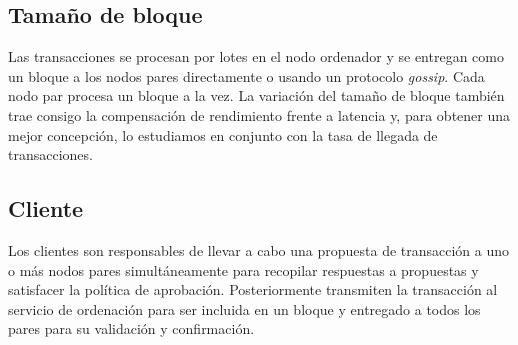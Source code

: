 \subsection{Tama\~no de bloque}
Las transacciones se procesan por lotes en el nodo ordenador y se entregan como un bloque a los nodos pares directamente o usando un protocolo \emph{gossip}. Cada nodo par procesa un bloque a la vez. La variaci\'on del tama\~no de bloque tambi\'en trae consigo la compensaci\'on de rendimiento frente a latencia y, para obtener una mejor concepci\'on, lo estudiamos en conjunto con la tasa de llegada de transacciones.

\subsection{Cliente}
Los clientes son responsables de llevar a cabo una propuesta de transacci\'on a uno o m\'as nodos pares simult\'aneamente para recopilar respuestas a propuestas y satisfacer la pol\'itica de aprobaci\'on. Posteriormente transmiten la transacci\'on al servicio de ordenaci\'on para ser incluida en un bloque y entregado a todos los pares para su validaci\'on y confirmaci\'on.

